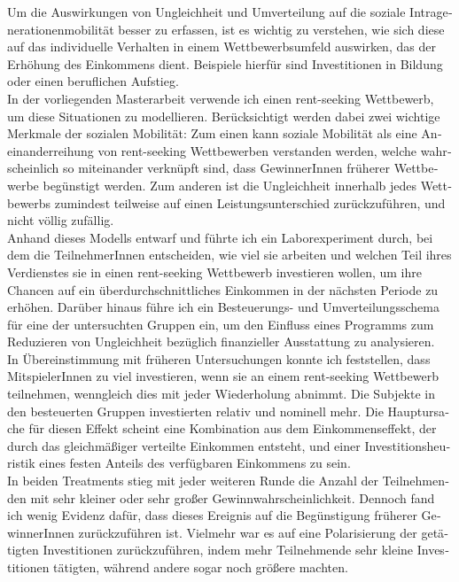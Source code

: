 \begin{otherlanguage}{ngerman}
\begin{small}
Um die Auswirkungen von Ungleichheit und Umverteilung auf die soziale Intragenerationenmobilität besser zu erfassen, ist es wichtig zu verstehen, wie sich diese auf das individuelle Verhalten in einem Wettbewerbsumfeld auswirken, das der Erhöhung des Einkommens dient. Beispiele hierfür sind Investitionen in Bildung oder einen beruflichen Aufstieg.\\

In der vorliegenden Masterarbeit verwende ich einen rent-seeking Wettbewerb, um diese Situationen zu modellieren. Berücksichtigt werden dabei zwei wichtige Merkmale der sozialen Mobilität: Zum einen kann soziale Mobilität als eine Aneinanderreihung von rent-seeking Wettbewerben verstanden werden, welche wahrscheinlich so miteinander verknüpft sind, dass GewinnerInnen früherer Wettbewerbe begünstigt werden. Zum anderen ist die Ungleichheit innerhalb jedes Wettbewerbs zumindest teilweise auf einen Leistungsunterschied zurückzuführen, und nicht völlig zufällig.\\

\vspace{-2mm}
Anhand dieses Modells entwarf und führte ich ein Laborexperiment durch, bei dem die TeilnehmerInnen entscheiden, wie viel sie arbeiten und welchen Teil ihres Verdienstes sie in einen rent-seeking Wettbewerb investieren wollen, um ihre Chancen auf ein überdurchschnittliches Einkommen in der nächsten Periode zu erhöhen. Darüber hinaus führe ich ein Besteuerungs- und Umverteilungsschema für eine der untersuchten Gruppen ein, um den Einfluss eines Programms zum Reduzieren von Ungleichheit bezüglich finanzieller Ausstattung zu analysieren.\\

In Übereinstimmung mit früheren Untersuchungen konnte ich feststellen, dass MitspielerInnen zu viel investieren, wenn sie an einem rent-seeking Wettbewerb teilnehmen, wenngleich dies mit jeder Wiederholung abnimmt. Die Subjekte in den besteuerten Gruppen investierten relativ und nominell mehr. Die Hauptursache für diesen Effekt scheint eine Kombination aus dem Einkommenseffekt, der durch das gleichmäßiger verteilte Einkommen entsteht, und einer Investitionsheuristik eines festen Anteils des verfügbaren Einkommens zu sein.\\

\vspace{-2mm}
In beiden Treatments stieg mit jeder weiteren Runde die Anzahl der Teilnehmenden mit sehr kleiner oder sehr großer Gewinnwahrscheinlichkeit. Dennoch fand ich wenig Evidenz dafür, dass dieses Ereignis auf die Begünstigung früherer GewinnerInnen zurückzuführen ist. Vielmehr war es auf eine Polarisierung der getätigten Investitionen zurückzuführen, indem mehr Teilnehmende sehr kleine Investitionen tätigten, während andere sogar noch größere machten.\\


\end{small}
\end{otherlanguage}
